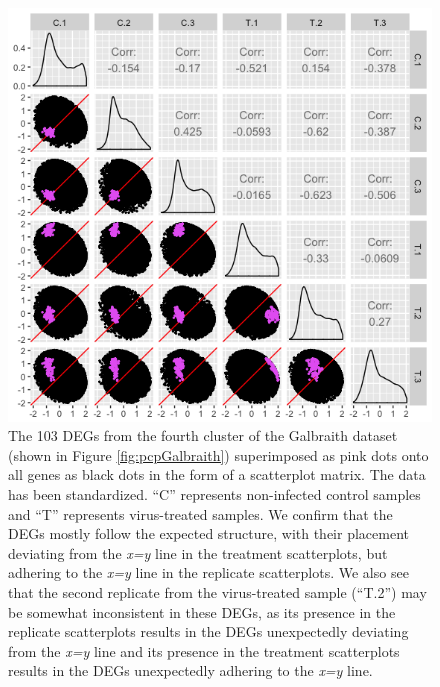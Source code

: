 \documentclass[11pt,a4paper,oldfontcommands,openany]{memoir}
\numberwithin{equation}{section} %
\begin{document}
\begin{figure}[H]
\begin{framed}
  \includegraphics[width=\textwidth]{Images/GalbraithClust4SM}
\end{framed}
  \caption{The 103 DEGs from the fourth cluster of the Galbraith dataset (shown in Figure \ref{fig:pcpGalbraith}) superimposed as pink dots onto all genes as black dots in the form of a scatterplot matrix. The data has been standardized. ``C'' represents non-infected control samples and ``T'' represents virus-treated samples. We confirm that the DEGs mostly follow the expected structure, with their placement deviating from the \textit{x=y} line in the treatment scatterplots, but adhering to the \textit{x=y} line in the replicate scatterplots. We also see that the second replicate from the virus-treated sample (``T.2'') may be somewhat inconsistent in these DEGs, as its presence in the replicate scatterplots results in the DEGs unexpectedly deviating from the \textit{x=y} line and its presence in the treatment scatterplots results in the DEGs unexpectedly adhering to the \textit{x=y} line.}
  \label{fig:GalbraithClust4SM}
\end{figure}
\end{document}
